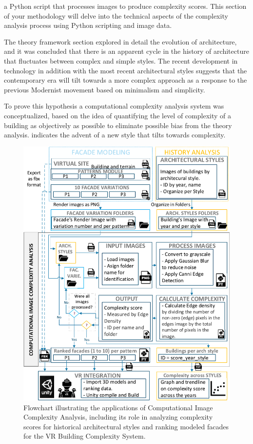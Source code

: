 
a Python script that processes images to produce complexity scores.
This section of your methodology will delve into the technical aspects of the complexity analysis process using Python scripting and image data.

The theory framework section explored in detail the evolution of architecture, and it was concluded that there is an apparent cycle in the history of architecture that fluctuates between complex and simple styles.
The recent development in technology in addition with the most recent architectural styles suggests that the contemporary era will tilt towards a more complex approach as a response to the previous Modernist movement based on minimalism and simplicity.

To prove this hypothesis a computational complexity analysis system was conceptualized, based on the idea of quantifying the level of complexity of a building as objectively as possible to eliminate possible bias from the theory analysis. indicates the advent of a new style that tilts towards complexity.

    \begin{figure}[!htb]
      \centering
      \includegraphics[width= \linewidth, trim=0 0 0 0, clip]{Images/ImageComplexityAnalysisFlowchart}
      \caption{Flowchart illustrating the applications of Computational Image Complexity Analysis, including its role in analyzing complexity scores for historical architectural styles and ranking modeled facades for the VR Building Complexity System.}
      \label{fig:ImageComplexityAnalysisFlowchart}
    \end{figure}